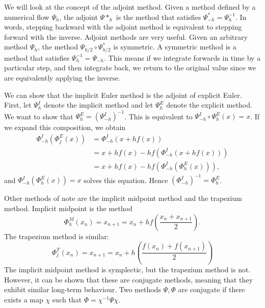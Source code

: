 \documentclass{report}
\theoremstyle{exampstyle} \newtheorem{example}[theorem]{Example}
\theoremstyle{exampstyle} \newtheorem{remark}[theorem]{Remark}
\theoremstyle{exampstyle} \newtheorem{definition}[theorem]{Definition}
\theoremstyle{exampstyle} \newtheorem{lemma}[theorem]{Lemma}
\begin{document}
We will look at the concept of the adjoint method. Given a method defined by a numerical flow $\Psi_h$,
the adjoint $\Psi*_h$ is the method that satisfies $\Psi^*_{-h} = \Psi^{-1}_h$.
In words, stepping backward with the adjoint method is equivalent to stepping forward with the inverse.
Adjoint methods are very useful. Given an arbitrary method $\Psi_h$,
the method $\Psi_{h/2} \circ \Psi_{h/2}^*$ is symmetric.
A symmetric method is a method that satisfies $\Psi_h^{-1} = \Psi_{-h}$.
This means if we integrate forwards in time by a particular step, and then integrate back,
we return to the original value since we are equivalently applying the inverse.

We can show that the implicit Euler method is the adjoint of explicit Euler.
First, let $\Psi_h^I$ denote the implicit method and let $\Psi_h^E$ denote the explicit method.
We want to show that $\Psi_h^E = (\Psi_{-h}^I)^{-1}$.
This is equivalent to $\Psi_{-h}^I \circ \Psi_h^E (x) = x$.
If we expand this composition, we obtain
\begin{align*}
	\Phi_{-h}^I \left( \Phi_j^E  (x) \right) &= \Phi_{-h}^I \left( x + h f(x) \right) \\
	&= x + h f(x) - h f\left( \Phi_{-h}^I \left( x + h f(x) \right) \right) \\
	&= x + h f(x) - h f\left( \Phi_{-h}^I \left( \Phi_h^E (x) \right) \right),
\end{align*}
and $\Phi_{-h}^I (\Phi_h^E (x)) = x$ solves this equation. Hence $(\Phi_{-h}^I)^{-1} = \Phi_h^E$.

Other methods of note are the implicit midpoint method and the trapezium method. Implicit midpoint is the method
\begin{equation*}
	\Phi_h^M (x_n) = x_{n+1} = x_n + hf\left(\frac{x_n + x_{n+1}}{2}\right).
\end{equation*}
The trapezium method is similar:
\begin{equation*}
	\Phi_j^T (x_n) = x_{n+1} = x_n + h \left(\frac{f(x_n) + f(x_{n+1})}{2}\right)
\end{equation*}
The implicit midpoint method is symplectic, but the trapezium method is not.
However, it can be shown that these are conjugate methods, meaning that they exhibit similar long-term behaviour.
Two methods $\Psi, \Phi$ are conjugate if there exists a map $\chi$ such that $\Phi = \chi^{-1} \Psi \chi$.

\end{document}
